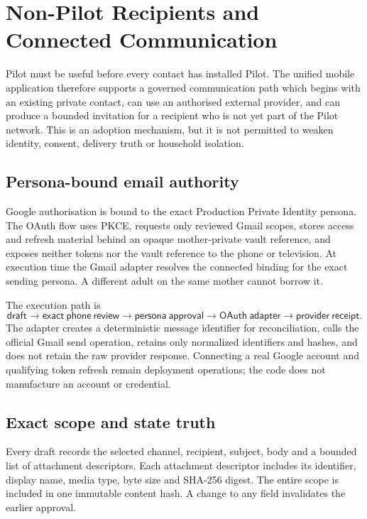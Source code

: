 \section{Non-Pilot Recipients and Connected Communication}
\label{sec:pilot-mobile-non-pilot}

Pilot must be useful before every contact has installed Pilot.  The unified mobile
application therefore supports a governed communication path which begins with an
existing private contact, can use an authorised external provider, and can produce a
bounded invitation for a recipient who is not yet part of the Pilot network.  This is
an adoption mechanism, but it is not permitted to weaken identity, consent, delivery
truth or household isolation.

\subsection{Persona-bound email authority}

Google authorisation is bound to the exact Production Private Identity persona.  The
OAuth flow uses PKCE, requests only reviewed Gmail scopes, stores access and refresh
material behind an opaque mother-private vault reference, and exposes neither tokens
nor the vault reference to the phone or television.  At execution time the Gmail
adapter resolves the connected binding for the exact sending persona.  A different
adult on the same mother cannot borrow it.

The execution path is
\[
 \mathsf{draft}\rightarrow\mathsf{exact\ phone\ review}\rightarrow
 \mathsf{persona\ approval}\rightarrow\mathsf{OAuth\ adapter}\rightarrow
 \mathsf{provider\ receipt}.
\]
The adapter creates a deterministic message identifier for reconciliation, calls the
official Gmail send operation, retains only normalized identifiers and hashes, and
does not retain the raw provider response.  Connecting a real Google account and
qualifying token refresh remain deployment operations; the code does not manufacture
an account or credential.

\subsection{Exact scope and state truth}

Every draft records the selected channel, recipient, subject, body and a bounded list
of attachment descriptors.  Each attachment descriptor includes its identifier,
display name, media type, byte size and SHA-256 digest.  The entire scope is included
in one immutable content hash.  A change to any field invalidates the earlier
approval.

